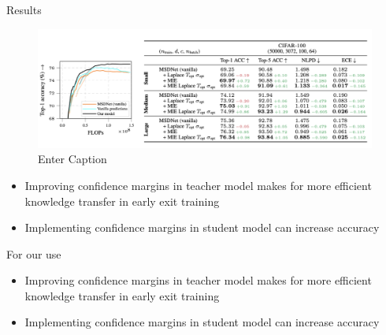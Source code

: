     \begin{frame}{Results}
    
        \begin{figure}
            \centering
            \includegraphics[width=0.8\linewidth]{Screenshot 2025-04-08 at 15.40.28.png}
            \caption{Enter Caption}
            \label{fig:enter-label}
        \end{figure}
        \begin{itemize}
            \item Improving confidence margins in teacher model makes for more efficient knowledge transfer in early exit training
            \item Implementing confidence margins in student model can increase accuracy
    
        \end{itemize}
    \end{frame}
    
    \begin{frame}{For our use}
        \begin{itemize}
            \item Improving confidence margins in teacher model makes for more efficient knowledge transfer in early exit training
            \item Implementing confidence margins in student model can increase accuracy
    
        \end{itemize}
    \end{frame}